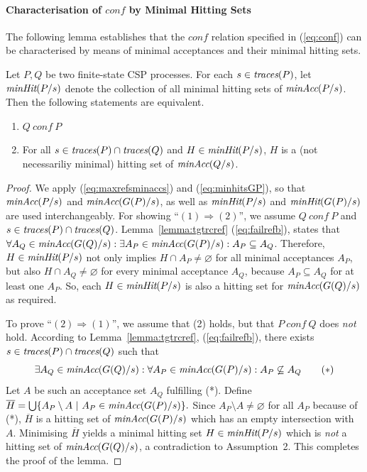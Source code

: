 \paragraph{Characterisation of $conf$ by Minimal Hitting Sets} The following lemma
establishes that the $conf$ relation specified in (\ref{eq:conf}) can be
characterised by means of minimal acceptances and their minimal hitting sets.
%
\begin{lemma}
\label{lemma:hseta}
Let $P, Q$ be two finite-state CSP processes.
For each $s\in\text{\it traces}(P)$,
let $\text{\it minHit}(P/s)$ denote the
collection of all minimal hitting sets of $\text{\it minAcc}(P/s)$.
Then the following statements are equivalent.
\begin{enumerate}
\item $Q\ conf\ P$

\item For all $s\in\text{\it traces}(P)\cap \text{\it traces}(Q)$ and $H \in  \text{\it minHit}(P/s)$, $H$ is
a (not necessariliy minimal) hitting set of $\text{\it minAcc}(Q/s)$.
\end{enumerate}
\end{lemma}
\begin{proof}
We apply (\ref{eq:maxrefsminaccs}) and (\ref{eq:minhitsGP}), so that
$\text{\it minAcc}(P/s)$ and $\text{\it minAcc}(G(P)/s)$, as well as $\text{\it minHit}(P/s)$ and
$\text{\it minHit}(G(P)/s)$ are used interchangeably. For showing ``$(1) \Rightarrow
(2)$'', we assume $Q\ conf\ P$ and $s\in\text{\it traces}(P)\cap \text{\it traces}(Q)$.
Lemma~\ref{lemma:tgtrcref} (\ref{eq:failrefb}), states that
$%
\forall A_Q\in\minaccs(G(Q)/s):
\exists A_P\in\minaccs(G(P)/s): A_P\subseteq A_Q
$. %
Therefore, $H \in  \text{\it minHit}(P/s)$ not only implies $H\cap A_P\neq\varnothing$
for all minimal acceptances $A_P$, but also $H\cap A_Q\neq\varnothing$ for
every minimal acceptance $A_Q$, because $A_P\subseteq A_Q$ for at least one
$A_P$. So, each $H \in \text{\it minHit}(P/s)$ is also a hitting set for
$\text{\it minAcc}(G(Q)/s)$ as required.

To prove ``$(2) \Rightarrow (1)$'', we assume that (2) holds, but that $P\
conf\ Q$ does {\it not} hold. According to Lemma~\ref{lemma:tgtrcref},
(\ref{eq:failrefb}), there exists $s\in\text{\it traces}(P)\cap \text{\it traces}(Q)$ such that
\[
\exists A_Q\in\text{\it minAcc}(G(Q)/s): \forall A_P\in\text{\it minAcc}(G(P)/s):
A_P\not\subseteq A_Q \qquad (*)
\]
Let $A$ be such an acceptance set $A_Q$ fulfilling (*).
Define
$%
\overline H = \bigcup\{ A_P \setminus A~|~A_P\in\minaccs(G(P)/s) \}.
$ %
Since $A_P \setminus A \neq\varnothing$ for all $A_P$ because of (*),
$\overline H$ is a hitting set of $\text{\it minAcc}(G(P)/s)$ which has an  empty
intersection with $A$. Minimising $\overline H$ yields   a minimal hitting
set $H\in \text{\it minHit}(P/s)$ which is {\it not} a hitting set of
$\text{\it minAcc}(G(Q)/s)$, a contradiction to Assumption~2.
This completes the proof of the lemma.
\xbox
\end{proof}
